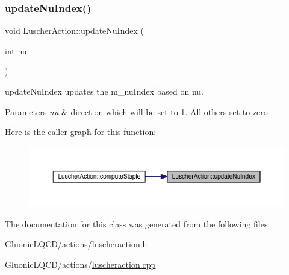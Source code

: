 \subsubsection{\texorpdfstring{updateNuIndex()}{updateNuIndex()}}
{\footnotesize\ttfamily void Luscher\+Action\+::update\+Nu\+Index (\begin{DoxyParamCaption}\item[{int}]{nu }\end{DoxyParamCaption})\hspace{0.3cm}{\ttfamily [inline]}}



update\+Nu\+Index updates the m\+\_\+nu\+Index based on nu. 


\begin{DoxyParams}{Parameters}
{\em nu} & direction which will be set to 1. All others set to zero. \\
\hline
\end{DoxyParams}
Here is the caller graph for this function\+:\nopagebreak
\begin{figure}[H]
\begin{center}
\leavevmode
\includegraphics[width=350pt]{class_luscher_action_a6496c97ed38401c0d94855bf940fd6ff_icgraph}
\end{center}
\end{figure}


The documentation for this class was generated from the following files\+:\begin{DoxyCompactItemize}
\item 
Gluonic\+L\+Q\+C\+D/actions/\mbox{\hyperlink{luscheraction_8h}{luscheraction.\+h}}\item 
Gluonic\+L\+Q\+C\+D/actions/\mbox{\hyperlink{luscheraction_8cpp}{luscheraction.\+cpp}}\end{DoxyCompactItemize}
